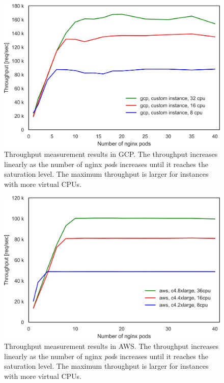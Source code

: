 \begin{figure}[h]
    \includegraphics[width=0.8\columnwidth]{Figs/gcp_all_tp}
  \par\bigskip
  \centering
  \begin{minipage}{0.8\columnwidth}
    \caption[Throughput measurement results in GCP]{
Throughput measurement results in GCP.
The throughput increases linearly as the number of nginx {\em pod}s increases until it reaches the saturation level.
The maximum throughput is larger for instances with more virtual CPUs.
    }
    \label{fig:gcp_all_tp}
  \end{minipage}
\end{figure}


\begin{figure}[h]
  \includegraphics[width=0.8\columnwidth]{Figs/aws_c4_tp}
  \par\bigskip
  \centering
  \begin{minipage}{0.8\columnwidth}
    \caption[Throughput measurement results in AWS]{
Throughput measurement results in AWS.
The throughput increases linearly as the number of nginx {\em pod}s increases until it reaches the saturation level.
The maximum throughput is larger for instances with more virtual CPUs.
    }
    \label{fig:aws_c4_tp}
  \end{minipage}
\end{figure}


